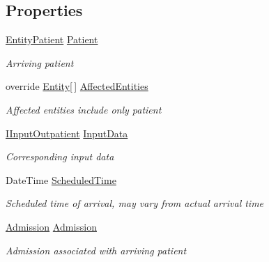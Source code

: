 \subsection*{Properties}
\begin{DoxyCompactItemize}
\item 
\hyperlink{class_general_health_care_elements_1_1_entities_1_1_entity_patient}{Entity\+Patient} \hyperlink{class_general_health_care_elements_1_1_department_models_1_1_outpatient_1_1_event_outpatient_arrival_ae9516aa6c2313098f940424dcefdc593}{Patient}
\begin{DoxyCompactList}\small\item\em Arriving patient \end{DoxyCompactList}\item 
override \hyperlink{class_simulation_core_1_1_h_c_c_m_elements_1_1_entity}{Entity}\mbox{[}$\,$\mbox{]} \hyperlink{class_general_health_care_elements_1_1_department_models_1_1_outpatient_1_1_event_outpatient_arrival_a50404aa639bb92512cab174c6a90cd55}{Affected\+Entities}
\begin{DoxyCompactList}\small\item\em Affected entities include only patient \end{DoxyCompactList}\item 
\hyperlink{interface_general_health_care_elements_1_1_department_models_1_1_outpatient_1_1_i_input_outpatient}{I\+Input\+Outpatient} \hyperlink{class_general_health_care_elements_1_1_department_models_1_1_outpatient_1_1_event_outpatient_arrival_acfdb21092d88b62fe7298c0f5546be3f}{Input\+Data}
\begin{DoxyCompactList}\small\item\em Corresponding input data \end{DoxyCompactList}\item 
Date\+Time \hyperlink{class_general_health_care_elements_1_1_department_models_1_1_outpatient_1_1_event_outpatient_arrival_ac7e8efc7a0a4e0f4580484f8594b4f39}{Scheduled\+Time}
\begin{DoxyCompactList}\small\item\em Scheduled time of arrival, may vary from actual arrival time \end{DoxyCompactList}\item 
\hyperlink{class_general_health_care_elements_1_1_treatment_admission_types_1_1_admission}{Admission} \hyperlink{class_general_health_care_elements_1_1_department_models_1_1_outpatient_1_1_event_outpatient_arrival_ab05fe93fdc3d983524ab2f36f3c372d8}{Admission}
\begin{DoxyCompactList}\small\item\em Admission associated with arriving patient \end{DoxyCompactList}\end{DoxyCompactItemize}


